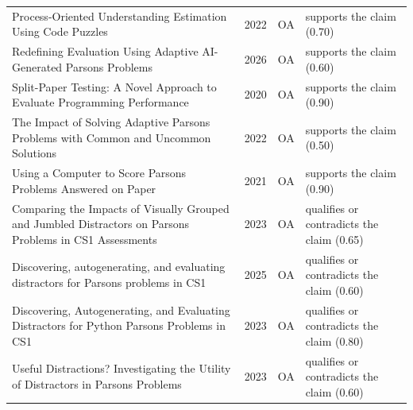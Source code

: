 \begin{longtable}{@{}%
  >{\raggedright\arraybackslash}p{}c%
  >{\raggedright\arraybackslash}p{}%
  >{\raggedright\arraybackslash}p{}@{}}
Process-Oriented Understanding Estimation Using Code Puzzles & 2022 & OA & supports the claim (0.70) \\
Redefining Evaluation Using Adaptive AI-Generated Parsons Problems & 2026 & OA & supports the claim (0.60) \\
Split-Paper Testing: A Novel Approach to Evaluate Programming Performance & 2020 & OA & supports the claim (0.90) \\
The Impact of Solving Adaptive Parsons Problems with Common and Uncommon Solutions & 2022 & OA & supports the claim (0.50) \\
Using a Computer to Score Parsons Problems Answered on Paper & 2021 & OA & supports the claim (0.90) \\
Comparing the Impacts of Visually Grouped and Jumbled Distractors on Parsons Problems in CS1 Assessments & 2023 & OA & qualifies or contradicts the claim (0.65) \\
Discovering, autogenerating, and evaluating distractors for Parsons problems in CS1 & 2025 & OA & qualifies or contradicts the claim (0.60) \\
Discovering, Autogenerating, and Evaluating Distractors for Python Parsons Problems in CS1 & 2023 & OA & qualifies or contradicts the claim (0.80) \\
Useful Distractions? Investigating the Utility of Distractors in Parsons Problems & 2023 & OA & qualifies or contradicts the claim (0.60) \\
\end{longtable}
\endgroup
